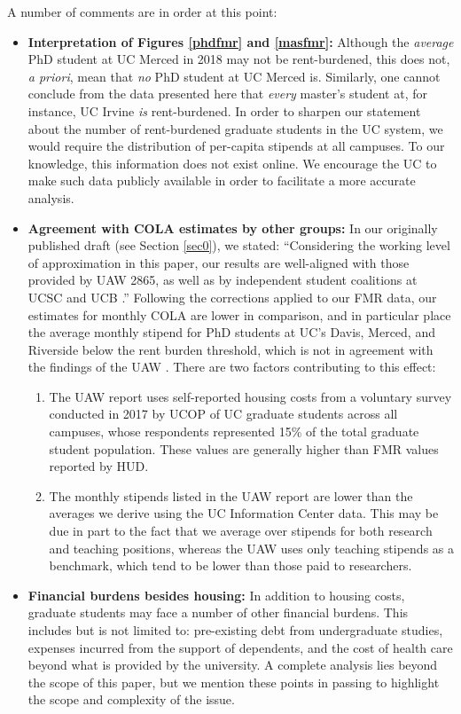\documentclass{article}
\begin{document}
A number of comments are in order at this point:
\begin{itemize}
	\item \textbf{Interpretation of Figures \ref{phdfmr} and \ref{masfmr}:} Although the \emph{average} PhD student at UC Merced in 2018 may not be rent-burdened, this does not, \emph{a priori}, mean that \emph{no} PhD student at UC Merced is. Similarly, one cannot conclude from the data presented here that \emph{every} master's student at, for instance, UC Irvine \emph{is} rent-burdened. In order to sharpen our statement about the number of rent-burdened graduate students in the UC system, we would require the distribution of per-capita stipends at all campuses. To our knowledge, this information does not exist online. We encourage the UC to make such data publicly available in order to facilitate a more accurate analysis.
	
	\item \textbf{Agreement with COLA estimates by other groups:} In our originally published draft (see Section \ref{sec0}), we stated: ``Considering the working level of approximation in this paper, our results are well-aligned with those provided by UAW 2865, as well as by independent student coalitions at UCSC and UCB \cite{uaw, ucsc, kqed}.'' Following the corrections applied to our FMR data, our estimates for monthly COLA are lower in comparison, and in particular place the average monthly stipend for PhD students at UC's Davis, Merced, and Riverside below the rent burden threshold, which is not in agreement with the findings of the UAW \cite{uaw}. There are two factors contributing to this effect: 
	\begin{enumerate}
		\item The UAW report uses self-reported housing costs from a voluntary survey conducted in 2017 by UCOP of UC graduate students across all campuses, whose respondents represented 15\% of the total graduate student population. These values are generally higher than FMR values reported by HUD.
		\item The monthly stipends listed in the UAW report are lower than the averages we derive using the UC Information Center data. This may be due in part to the fact that we average over stipends for both research and teaching positions, whereas the UAW uses only teaching stipends as a benchmark, which tend to be lower than those paid to researchers.
	\end{enumerate}
	\item \textbf{Financial burdens besides housing:} In addition to housing costs, graduate students may face a number of other financial burdens. This includes but is not limited to: pre-existing debt from undergraduate studies, expenses incurred from the support of dependents, and the cost of health care beyond what is provided by the university. A complete analysis lies beyond the scope of this paper, but we mention these points in passing to highlight the scope and complexity of the issue.
\end{itemize}
\end{document}
